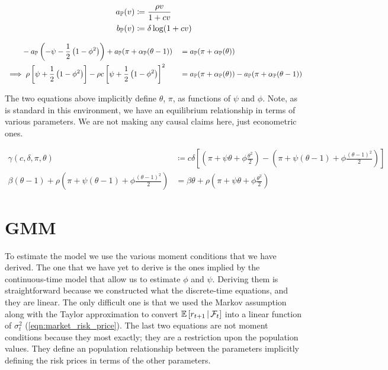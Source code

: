 \documentclass[11pt, letterpaper, twoside, final]{article}
\begin{document}
\begin{align}
    a_{\mathbb{P}}(v) &\coloneqq \frac{\rho v}{1 + c v} \\
    b_{\mathbb{P}}(v) &\coloneqq \delta \log(1 + c v) 
\end{align}





\begin{alignat}{2}
    &\hphantom{\implies} - a_{\PP}\left(-\psi - \frac{1}{2}\left(1 - \phi^2\right)\right)  + a_{\PP}(\pi +
      \alpha_{\PP}(\theta -1)) 
    &&= a_{\PP}(\pi + \alpha_{\PP}(\theta))  \\
%
    &\implies \rho \left[\psi +  \frac{1}{2}\left(1 - \phi^2\right)\right]  - \rho c \left[\psi + \frac{1}{2}\left(1
      - \phi^2\right)\right]^2 
    &&= a_{\PP}(\pi + \alpha_{\PP}(\theta)) - a_{\PP}(\pi + \alpha_{\PP}(\theta -1))  \\
\end{alignat}



The two equations above implicitly define $\theta$, $\pi$, as functions of $\psi$ and $\phi$.
Note, as is standard in this environment, we have an equilibrium relationship in terms of various parameters.
We are not making any causal claims here, just econometric ones.


\begin{defn}
    \begin{align}
        \gamma(c, \delta, \pi, \theta)  &\coloneqq c \delta \left[\left(\pi + \psi \theta + \phi
        \frac{\theta^2}{2} \right)  - \left(\pi + \psi(\theta - 1) + \phi \frac{(\theta - 1)^2}{2}\right)
        \right]\\ 
%
    \beta (\theta - 1) + \rho \left(\pi + \psi (\theta-1)  + \phi \frac{(\theta -1)^2}{2}\right)
    &= \beta \theta + \rho \left(\pi + \psi \theta  + \phi \frac{\theta^2}{2}\right) 
    \end{align}
\end{defn}



\section{GMM}\label{sec:GMM}

To estimate the model we use the various moment conditions that we have derived.
The one that we have yet to derive is the ones implied by the continuous-time model that allow us to estimate
$\phi$ and $\psi$.
Deriving them is straightforward because we constructed what the discrete-time equations, and they are linear.
The only difficult one is that we used the Markov assumption along with the Taylor approximation to convert
$\operatorname{\mathbb{E}}\left[r_{t+1} \,\middle\vert\, \mathcal{F}_t\right]$ into a linear function of $\sigma^2_t$ (\cref{eqn:market_risk_price}).
The last two equations are not moment conditions because they most exactly; they are a restriction upon the
population values.
They define an population relationship between the parameters implicitly defining the risk prices in terms of the
other parameters. 
\end{document}
